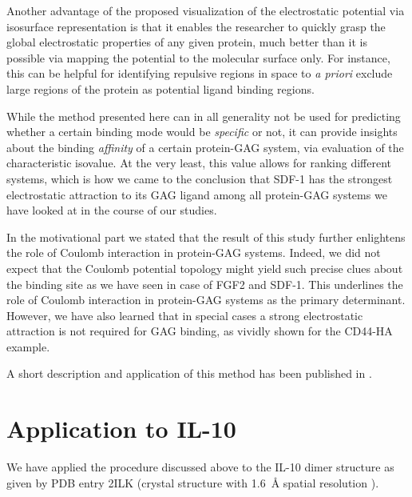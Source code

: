 Another advantage of the proposed visualization of the electrostatic potential
via isosurface representation is that it enables the researcher to quickly grasp
the global electrostatic properties of any given protein, much better than it is
possible via mapping the potential to the molecular surface only. For instance,
this can be helpful for identifying repulsive regions in space to \textit{a
priori} exclude large regions of the protein as potential ligand binding
regions.

While the method presented here can in all generality not be used for predicting
whether a certain binding mode would be \textit{specific} or not, it can provide
insights about the binding \textit{affinity} of a certain protein-GAG system,
via evaluation of the characteristic isovalue. At the very least, this value
allows for ranking different systems, which is how we came to the conclusion
that SDF-1 has the strongest electrostatic attraction to its GAG ligand among
all protein-GAG systems we have looked at in the course of our studies.

In the motivational part we stated that the result of this study further
enlightens the role of Coulomb interaction in protein-GAG systems. Indeed, we
did not expect that the Coulomb potential topology might yield such precise
clues about the binding site as we have seen in case of FGF2 and SDF-1. This
underlines the role of Coulomb interaction in protein-GAG systems as the primary
determinant. However, we have also learned that in special cases a strong
electrostatic attraction is not required for GAG binding, as vividly shown for
the CD44-HA example.

A short description and application of this method has been published in
\cite{dmd_samsonov_gehrcke_2014}.




\section{Application to IL-10}

We have applied the procedure discussed above to the IL-10 dimer structure as
given by PDB entry 2ILK (crystal structure with \SI{1.6}{\angstrom} spatial
resolution \cite{Zdanov1996}).

